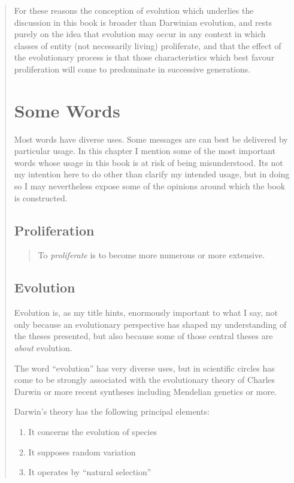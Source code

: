 {\begin{quote}
For these reasons the conception of evolution which underlies the discussion in this book is broader than Darwinian evolution, and rests purely on the idea that evolution may occur in any context in which classes of entity (not necessarily living) proliferate, and that the effect of the evolutionary process is that those characteristics which best favour proliferation will come to predominate in successive generations.

\section{Some Words}\label{SomeWOrds}

Most words have diverse uses.
Some messages are can best be delivered by particular usage.
In this chapter I mention some of the most important words whose usage in this book is at risk of being misunderstood.
Its not my intention here to do other than clarify my intended usage, but in doing so I may nevertheless expose some of the opinions around which the book is constructed.

\subsection{Proliferation}

\begin{quote}
To \emph{proliferate} is to become more numerous or more extensive.
\end{quote}

\subsection{Evolution}

Evolution is, as my title hints, enormously important to what I say, not only because an evolutionary perspective has shaped my understanding of the theses presented, but also because some of those central theses are \emph{about} evolution.

The word ``evolution'' has very diverse uses, but in scientific circles has come to be strongly associated with the evolutionary theory of Charles Darwin or more recent syntheses including Mendelian genetics or more.

Darwin's theory has the following principal elements:
\begin{enumerate}
\item It concerns the evolution of species
\item It supposes random variation
\item It operates by ``natural selection''
\end{enumerate}


\end{quote}}

